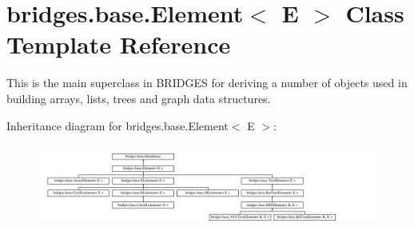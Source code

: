 \hypertarget{classbridges_1_1base_1_1_element}{}\section{bridges.\+base.\+Element$<$ E $>$ Class Template Reference}
\label{classbridges_1_1base_1_1_element}


This is the main superclass in B\+R\+I\+D\+G\+E\+S for deriving a number of objects used in building arrays, lists, trees and graph data structures.  


Inheritance diagram for bridges.\+base.\+Element$<$ E $>$\+:\begin{figure}[H]
\begin{center}
\leavevmode
\includegraphics[height=2.788382cm]{classbridges_1_1base_1_1_element}
\end{center}
\end{figure}
